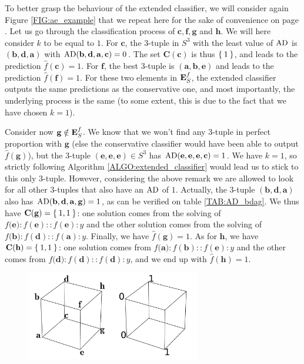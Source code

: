 \begin{testexample}
To better grasp the behaviour of the extended classifier, we will consider
again Figure \ref{FIG:ae_example} that we repeat here for the sake of
  convenience on page \pageref{FIG:ae_example2}. Let us go
through the classification process of $\mathbf{c}, \mathbf{f}, \mathbf{g}$ and
$\mathbf{h}$. We will here consider $k$ to be equal to $1$. For $\mathbf{c}$,
the $3$-tuple in $S^3$ with the least value of $\text{AD}$ is $(\mathbf{b},
\mathbf{d}, \mathbf{a})$ with $\text{AD}(\mathbf{b},\mathbf{d}, \mathbf{a},
\mathbf{c}) = 0$. The set $\mathbf{C}(\mathbf{c})$ is thus $\Set{1}$, and leads
to the prediction $\hat{f}(\mathbf{c}) = 1$. For $\mathbf{f}$, the best
$3$-tuple is $(\mathbf{a}, \mathbf{b}, \mathbf{e})$ and leads to the prediction
$\hat{f}(\mathbf{f}) = 1$. For these two elements in $\mathbf{E}_{S}^{f}$, the extended
classifier outputs the same predictions as the conservative one, and most
  importantly, the underlying process is the same (to some extent, this
  is due to the fact that we have chosen $k = 1$).

Consider now $\mathbf{g} \notin \mathbf{E}_{S}^{f}$. We know that we won't find any $3$-tuple
in perfect proportion with $\mathbf{g}$ (else the conservative classifier would
have been able to output $\hat{f}(\mathbf{g})$), but the $3$-tuple
$(\mathbf{e}, \mathbf{e}, \mathbf{e}) \in S^3$ has $\text{AD}(\mathbf{e}, \mathbf{e},
\mathbf{e}, \mathbf{c}) = 1$. We have $k = 1$, so strictly following Algorithm
\ref{ALGO:extended_classifier} would lead us to stick to this only $3$-tuple.
However, considering the above remark we are allowed to look for all other
$3$-tuples that also have an $\text{AD}$ of $1$. Actually, the $3$-tuple
$(\mathbf{b}, \mathbf{d}, \mathbf{a})$ also has $\text{AD}(\mathbf{b},\mathbf{d},
\mathbf{a}, \mathbf{g}) = 1$, as can be verified on table \ref{TAB:AD_bdag}. We
thus have $\mathbf{C}(\mathbf{g}) = \Set{1, 1}$: one solution comes from the
  solving of
$f(\mathbf{e)} :f(\mathbf{e}):: f(\mathbf{e}) : y$ and the other solution 
comes from the solving of $f(\mathbf{b)} :f(\mathbf{d}):: f(\mathbf{a}) : y$.  Finally, we
have $\hat{f}(\mathbf{g}) = 1$. As for $\mathbf{h}$, we have
$\mathbf{C}(\mathbf{h}) = \Set{1, 1}$: one solution comes from $f(\mathbf{a)}
:f(\mathbf{b}):: f(\mathbf{e}) : y$ and the other comes from $f(\mathbf{d)}
:f(\mathbf{d}):: f(\mathbf{d}) : y$, and we end up with $\hat{f}(\mathbf{h}) =
1$.
\end{testexample}

\begin{figure}[!h]
\centering
  \includegraphics[width=3in]{figures/ae_example.pdf}
  \label{FIG:ae_example2}
\end{figure}

